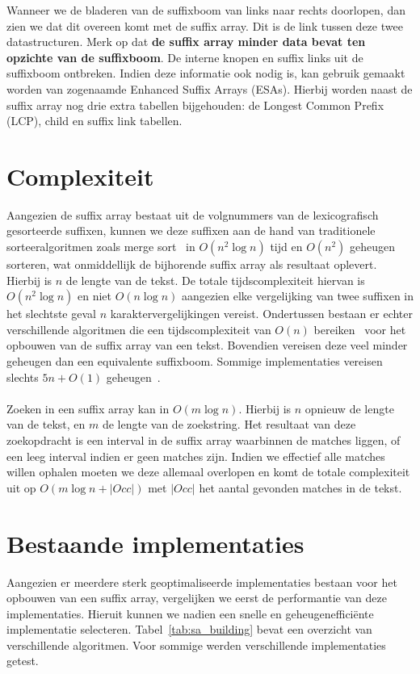 Wanneer we de bladeren van de suffixboom van links naar rechts doorlopen, dan zien we dat dit overeen komt met de suffix array.
Dit is de link tussen deze twee datastructuren.
Merk op dat \textbf{de suffix array minder data bevat ten opzichte van de suffixboom}.
De interne knopen en suffix links uit de suffixboom ontbreken.
Indien deze informatie ook nodig is, kan gebruik gemaakt worden van zogenaamde Enhanced Suffix Arrays (ESAs).
Hierbij worden naast de suffix array nog drie extra tabellen bijgehouden: de Longest Common Prefix (LCP), child en suffix link tabellen.


\section{Complexiteit}\label{sec:complexiteit}
Aangezien de suffix array bestaat uit de volgnummers van de lexicografisch gesorteerde suffixen, kunnen we deze suffixen aan de hand van traditionele sorteeralgoritmen zoals merge sort~\cite{mergeSort} in $O(n^2 \log n)$ tijd en $O(n^2)$ geheugen sorteren, wat onmiddellijk de bijhorende suffix array als resultaat oplevert.
Hierbij is $n$ de lengte van de tekst.
De totale tijdscomplexiteit hiervan is $O(n^2 \log n)$ en niet $O(n \log n)$ aangezien elke vergelijking van twee suffixen in het slechtste geval $n$ karaktervergelijkingen vereist.
Ondertussen bestaan er echter verschillende algoritmen die een tijdscomplexiteit van $O(n)$ bereiken~\cite{sais, ko_alura, radixSA, dark_archon, libdivsufsort} voor het opbouwen van de suffix array van een tekst.
Bovendien vereisen deze veel minder geheugen dan een equivalente suffixboom.
Sommige implementaties vereisen slechts $5n + O(1)$ geheugen~\cite{dark_archon, libdivsufsort}.
\\ \\
Zoeken in een suffix array kan in $O(m \log n)$.
Hierbij is $n$ opnieuw de lengte van de tekst, en $m$ de lengte van de zoekstring.
Het resultaat van deze zoekopdracht is een interval in de suffix array waarbinnen de matches liggen, of een leeg interval indien er geen matches zijn.
Indien we effectief alle matches willen ophalen moeten we deze allemaal overlopen en komt de totale complexiteit uit op $O(m \log n + |Occ|)$ met $|Occ|$ het aantal gevonden matches in de tekst.


\section{Bestaande implementaties}\label{sec:bestaande-implementaties}
Aangezien er meerdere sterk geoptimaliseerde implementaties bestaan voor het opbouwen van een suffix array, vergelijken we eerst de performantie van deze implementaties.
Hieruit kunnen we nadien een snelle en geheugenefficiënte implementatie selecteren.
Tabel~\ref{tab:sa_building} bevat een overzicht van verschillende algoritmen.
Voor sommige werden verschillende implementaties getest.

